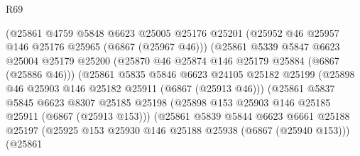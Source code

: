 \begin{lexlean}{R69}
\begin{coremodule}
{                                (@25861
                                  @4759
                                  @5848
                                  @6623
                                  @25005
                                  @25176
                                  @25201
                                  (@25952 @46 @25957 @146 @25176 @25965 (@6867 (@25967 @46)))
                                  (@25861
                                    @5339
                                    @5847
                                    @6623
                                    @25004
                                    @25179
                                    @25200
                                    (@25870 @46 @25874 @146 @25179 @25884 (@6867 (@25886 @46)))
                                    (@25861
                                      @5835
                                      @5846
                                      @6623
                                      @24105
                                      @25182
                                      @25199
                                      (@25898 @46 @25903 @146 @25182 @25911 (@6867 (@25913 @46)))
                                      (@25861
                                        @5837
                                        @5845
                                        @6623
                                        @8307
                                        @25185
                                        @25198
                                        (@25898
                                          @153
                                          @25903
                                          @146
                                          @25185
                                          @25911
                                          (@6867 (@25913 @153)))
                                        (@25861
                                          @5839
                                          @5844
                                          @6623
                                          @6661
                                          @25188
                                          @25197
                                          (@25925
                                            @153
                                            @25930
                                            @146
                                            @25188
                                            @25938
                                            (@6867 (@25940 @153)))
                                          (@25861
}
\end{coremodule}
\end{lexlean}
